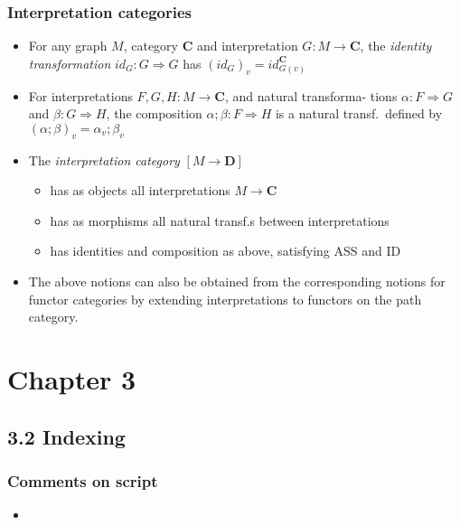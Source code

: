 \documentclass[handout]{beamer}
\newcommand{\To}{\Rightarrow}
\newcommand{\bfsf}[1]{{\boldsymbol{#1}}}
\newcommand{\CC}{\bfsf{C}}
\newcommand{\DD}{\bfsf{D}}
\begin{document}
\frame
  {   
    \frametitle{Interpretation categories}\label{Ch3:interpretationcats}

 \begin{itemize}[<+->]
\item For any graph $M$,  category $\CC$ and interpretation $G: M\to\CC$, the 
\emph{identity transformation} $id_G : G\To G$ has $(id_G)_v = id^\CC_{G(v)}$
\item For interpretations $F,G,H: M\to\CC$, and natural
transforma- tions $\alpha: F\To G$ and $\beta:G\To H$, the composition
$\alpha;\beta: F\To H$ is a natural transf.\ defined by 
$(\alpha;\beta)_v= \alpha_v;\beta_v$
 \item The \emph{interpretation category} $[M\to\DD]$
   \begin{itemize}[<+->]
\item has as objects all interpretations $M\to\CC$
\item has as morphisms all natural transf.s  between interpretations
\item has identities and composition as above, satisfying ASS and ID
   \end{itemize}
\item The above notions can also be obtained from the corresponding
notions for functor categories by extending interpretations
to functors on the path category.
 \end{itemize}

 }


\section{Chapter 3}
\subsection{3.2 Indexing}

\frame
  {   
    \frametitle{Comments on script}\label{Ch3:comments}

 \begin{itemize}[<+->]
\item 
 \end{itemize}

 }
\end{document}
